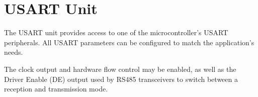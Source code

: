 
\section{USART Unit}

The USART unit provides access to one of the microcontroller's USART peripherals. All USART parameters can be configured to match the application's needs. 

The clock output and hardware flow control may be enabled, as well as the Driver Enable (DE) output used by RS485 transceivers to switch between a reception and transmission mode.